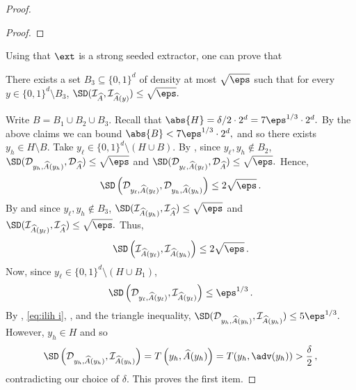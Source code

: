 \documentclass{toc}
\begin{document}
\begin{proof}
\begin{proof}
	\end{proof}
	Using that $\ext$ is a strong seeded extractor, one can prove that
	\begin{claim}\label{claim:i is concentrated i}
		There exists a set
		$B_3 \subseteq \{0,1\}^d$ of density at most $\sqrt{\eps}$ such that for every $y \in \{0,1\}^d \setminus B_3$,
		$
		\SD(\mathcal{I}_{\widehat{A}}, \mathcal{I}_{\widehat{A}(y)}) \le \sqrt{\eps}.
		$
	\end{claim}
	
	Write $B = B_1 \cup B_2 \cup B_3$. Recall that 
	$\abs{H} = \delta/2\cdot 2^d = 7\eps^{1/3} \cdot 2^d.$ 
	By the above claims we can bound
	$
	\abs{B} < 7\eps^{1/3} \cdot 2^d,
	$
	and so there exists $y_h \in H \setminus B$.  Take $y_\ell \in \{0,1\}^d \setminus (H \cup B)$. 	
	By , since $y_\ell,y_h \notin B_2$,
	$\SD(\mathcal{D}_{y_h,\widehat{A}(y_h)}, \mathcal{D}_{\widehat{A}} ) \le \sqrt{\eps}$ and
	$\SD(\mathcal{D}_{y_\ell,\widehat{A}(y_\ell)}, \mathcal{D}_{\widehat{A}} ) \le \sqrt{\eps}.
	$
	Hence,
	\begin{equation}\label{eq:dldh i}
	\SD\left(\mathcal{D}_{y_\ell,\widehat{A}(y_\ell)}, \mathcal{D}_{y_h,\widehat{A}(y_h)}\right) \le 2\sqrt{\eps}\,.
	\end{equation}
	By  and since $y_\ell,y_h \notin B_3$,
 	$
	\SD(\mathcal{I}_{\widehat{A}(y_h)}, \mathcal{I}_{\widehat{A}} ) \le \sqrt{\eps}$ and
	$\SD(\mathcal{I}_{\widehat{A}(y_\ell)}, \mathcal{I}_{\widehat{A}} ) \le \sqrt{\eps}.
$
	Thus,
	\begin{equation}\label{eq:ilih i}
	\SD\left(\mathcal{I}_{\widehat{A}(y_\ell)}, \mathcal{I}_{\widehat{A}(y_h)} \right) \le 2\sqrt{\eps}\,.
	\end{equation}
	Now, since $y_\ell \in \{0,1\}^d \setminus (H \cup B_1)$,
	\begin{equation}\label{eq:dlil i}
	\SD\left(\mathcal{D}_{y_\ell,\widehat{A}(y_\ell)}, \mathcal{I}_{\widehat{A}(y_\ell)}\right) \le \eps^{1/3}\,.
	\end{equation}
%
 By , \eqref{eq:ilih i}, , %
and the triangle inequality,
	$
	\SD(\mathcal{D}_{y_h,\widehat{A}(y_h)}, \mathcal{I}_{\widehat{A}(y_h)}) \le 5 \eps^{1/3}.
	$
	However, $y_h \in H$ and so
	\begin{align*}
	\SD\left( \mathcal{D}_{y_h,\widehat{A}(y_h)}, \mathcal{I}_{\widehat{A}(y_h)} \right) = T\left(y_h,\widehat{A}(y_h)\right) 
	= T(y_h, \adv(y_h)) > \frac{\delta}{2}\,,
	\end{align*}
	contradicting our choice of $\delta$. This proves the first item.
	

\end{proof}
\end{document}
